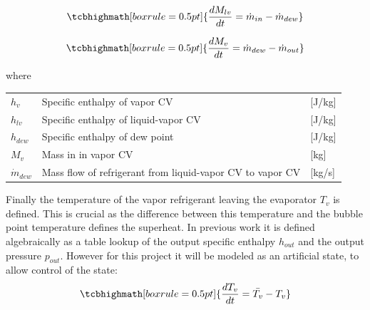 \begin{equation} \label{eq:evap_dMlv}
	\tcbhighmath[boxrule = 0.5pt]{\frac{dM_{lv}}{dt} = \dot{m}_{in} - \dot{m}_{dew}  }
\end{equation}

\begin{equation} \label{eq:evap_dMv}
	\tcbhighmath[boxrule = 0.5pt]{\frac{dM_v}{dt}   = \dot{m}_{dew} - \dot{m}_{out}  }
\end{equation}

\smallskip

where

\begin{center}
	\begin{tabular}{l p{10cm} l}
		$h_{v}$         & Specific enthalpy of vapor CV                                            & [\si{J}/\si{kg}]                  \\
		$h_{lv}$        & Specific enthalpy of liquid-vapor CV                                     & [\si{J}/\si{kg}]                  \\
		$h_{dew}$        & Specific enthalpy of dew point                                           & [\si{J}/\si{kg}]                  \\
		$M_{v}$          & Mass in	in vapor CV                                                      & [\si{kg}]                  \\
		$\dot{m}_{dew}$ & Mass flow of refrigerant from liquid-vapor CV to vapor CV                & [\si{kg}/\si{s}]                  \\
	\end{tabular}
\end{center}

Finally the temperature of the vapor refrigerant leaving the evaporator $T_v$ is defined. This is crucial as the difference between this temperature and the bubble point temperature defines the superheat. In previous work \cite{Sorensen2013} it is defined algebraically as a table lookup of the output specific enthalpy $h_{out}$ and the output pressure $p_{out}$. However for this project it will be modeled as an artificial state, to allow control of the state:
\begin{equation}\label{eq:tv_initial}
	\tcbhighmath[boxrule = 0.5pt]{\frac{dT_{v}}{dt} = \bar{T_v} - T_v} %
\end{equation}

